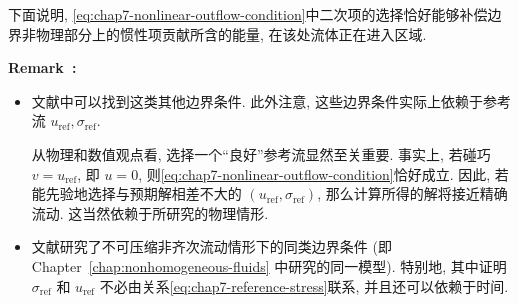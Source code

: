 \begin{sloppypar}
下面说明, \eqref{eq:chap7-nonlinear-outflow-condition}中二次项的选择恰好能够补偿边界非物理部分上的惯性项贡献所含的能量, 在该处流体正在进入区域.

\par\noindent{}\textbf{Remark~\thechaptersevensectiononeremark:}\label{rem:chap7-reference-outflow-condition}
\begin{itemize}
 \item 文献中可以找到这类其他边界条件. 此外注意, 这些边界条件实际上依赖于参考流 $u_{\mathrm{ref}},\sigma_{\mathrm{ref}}$.

 从物理和数值观点看, 选择一个``良好''参考流显然至关重要. 事实上, 若碰巧 $v=u_{\mathrm{ref}}$, 即 $u=0$, 则\eqref{eq:chap7-nonlinear-outflow-condition}恰好成立. 因此, 若能先验地选择与预期解相差不大的 $(u_{\mathrm{ref}},\sigma_{\mathrm{ref}})$, 那么计算所得的解将接近精确流动. 这当然依赖于所研究的物理情形.
 \item 文献研究了不可压缩非齐次流动情形下的同类边界条件 (即 Chapter~\ref{chap:nonhomogeneous-fluids} 中研究的同一模型). 特别地, 其中证明 $\sigma_{\mathrm{ref}}$ 和 $u_{\mathrm{ref}}$ 不必由关系\eqref{eq:chap7-reference-stress}联系, 并且还可以依赖于时间.
\end{itemize}


\end{sloppypar}
